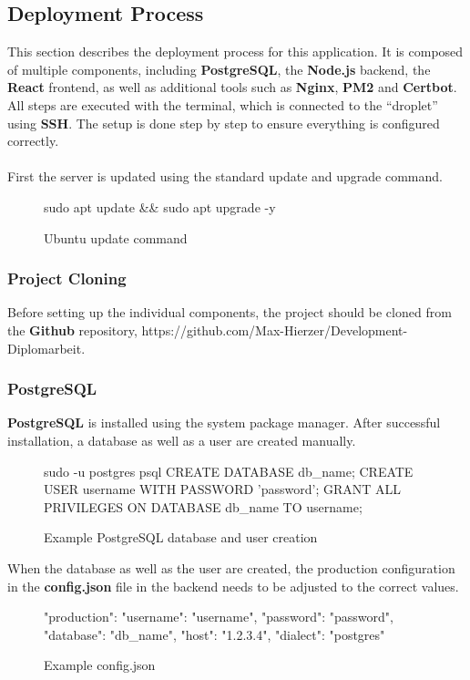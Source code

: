 \documentclass[a4paper,12pt]{report}
\begin{document}
\subsection{Deployment Process}
This section describes the deployment process for this application. It is composed of multiple components, including \textbf{PostgreSQL}, the \textbf{Node.js} backend, the \textbf{React} frontend, as well as additional tools such as \textbf{Nginx}, \textbf{PM2} and \textbf{Certbot}. All steps are executed with the terminal, which is connected to the “droplet” using \textbf{SSH}. The setup is done step by step to ensure everything is configured correctly.\\\\
First the server is updated using the standard update and upgrade command.
\begin{figure}[H]
	\begin{terminal}
		sudo apt update && sudo apt upgrade -y
	\end{terminal}
	\caption{Ubuntu update command}
\end{figure}
\subsubsection{Project Cloning}
Before setting up the individual components, the project should be cloned from the \textbf{Github} repository, https://github.com/Max-Hierzer/Development-Diplomarbeit.
\subsubsection{PostgreSQL}
\textbf{PostgreSQL} is installed using the system package manager. After successful installation, a database as well as a user are created manually.
\begin{figure}[H]
	\begin{terminal}
		sudo -u postgres psql
		CREATE DATABASE db_name;
		CREATE USER username WITH PASSWORD 'password';
		GRANT ALL PRIVILEGES ON DATABASE db_name TO username;
		\q
	\end{terminal}
	\caption{Example PostgreSQL database and user creation}
\end{figure}

When the database as well as the user are created, the production configuration in the \textbf{config.json} file in the backend needs to be adjusted to the correct values.
\begin{figure}[H]
	\begin{terminal}
		"production": {
			"username": "username",
			"password": "password",
			"database": "db_name",
			"host": "1.2.3.4",
			"dialect": "postgres"
		}
	\end{terminal}
	\caption{Example config.json}
\end{figure}
\end{document}
